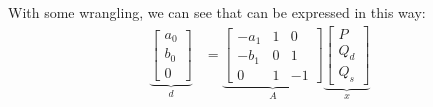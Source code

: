 \documentclass{article}
\begin{document}
With some wrangling, we can see that  can be expressed in this way:
\begin{align*}
  \underbrace{
    \begin{bmatrix}
      a_0
      \\
      b_0
      \\
      0
    \end{bmatrix}
  }_{d}
  &
  =
  \underbrace{
    \begin{bmatrix}
      - a_1 & 1 & 0
      \\
      - b_1 & 0 & 1
      \\
      0 & 1 & -1
    \end{bmatrix}
  }_{A}
  \underbrace{
    \begin{bmatrix}
      P
      \\
      Q_d
      \\
      Q_s
    \end{bmatrix}
  }_{x}
\end{align*}
\end{document}
